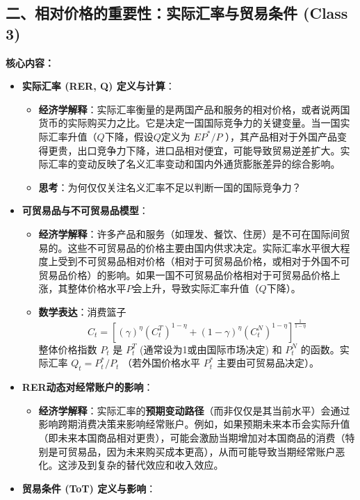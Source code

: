 \documentclass[12pt]{article}
\begin{document}
\subsection*{二、相对价格的重要性：实际汇率与贸易条件 (Class 3)}

\textbf{核心内容：}
\begin{itemize}
    \item \textbf{实际汇率 (RER, Q) 定义与计算}：
    \begin{itemize}
        \item \textbf{经济学解释}：实际汇率衡量的是两国产品和服务的相对价格，或者说两国货币的实际购买力之比。它是决定一国国际竞争力的关键变量。当一国实际汇率升值（$Q$下降，假设$Q$定义为 $EP^*/P$ ），其产品相对于外国产品变得更贵，出口竞争力下降，进口品相对便宜，可能导致贸易逆差扩大。实际汇率的变动反映了名义汇率变动和国内外通货膨胀差异的综合影响。
        \item \textbf{思考}：为何仅仅关注名义汇率不足以判断一国的国际竞争力？
    \end{itemize}
    \item \textbf{可贸易品与不可贸易品模型}：
    \begin{itemize}
        \item \textbf{经济学解释}：许多产品和服务（如理发、餐饮、住房）是不可在国际间贸易的。这些不可贸易品的价格主要由国内供求决定。实际汇率水平很大程度上受到不可贸易品相对价格（相对于可贸易品价格，或相对于外国不可贸易品价格）的影响。如果一国不可贸易品价格相对于可贸易品价格上涨，其整体价格水平$P$会上升，导致实际汇率升值（$Q$下降）。
        \item \textbf{数学表达}：消费篮子
        \[
        C_t = [(\gamma)^{\eta}(C_t^T)^{1-\eta}+(1-\gamma)^{\eta}(C_t^N)^{1-\eta}]^{\frac{1}{1-\eta}}
        \]
        整体价格指数 $P_t$ 是 $P_t^T$ (通常设为1或由国际市场决定) 和 $P_t^N$ 的函数。实际汇率 $Q_t = P_t^*/P_t$ （若外国价格水平 $P_t^*$ 主要由可贸易品决定）。
    \end{itemize}
    \item \textbf{RER动态对经常账户的影响}：
    \begin{itemize}
        \item \textbf{经济学解释}：实际汇率的\textbf{预期变动路径}（而非仅仅是其当前水平）会通过影响跨期消费决策来影响经常账户。例如，如果预期未来本币会实际升值（即未来本国商品相对更贵），可能会激励当期增加对本国商品的消费（特别是可贸易品，因为未来购买成本更高），从而可能导致当期经常账户恶化。这涉及到复杂的替代效应和收入效应。
    \end{itemize}
    \item \textbf{贸易条件 (ToT) 定义与影响}：

\end{itemize}
\end{document}
